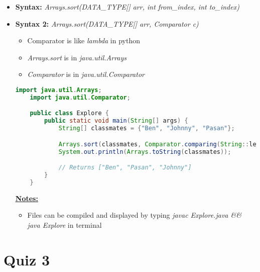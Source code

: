\documentclass[12pt]{article}
\begin{document}
\bigskip


\begin{itemize}
    \item \textbf{Syntax:} \textit{Arrays.sort(DATA\_TYPE[] arr, int from\_index, int to\_index)}
    \item \textbf{Syntax 2:} \textit{Arrays.sort(DATA\_TYPE[] arr, Comparator c)}
    \begin{itemize}
        \item Comparator is like \textit{lambda} in python
        \item \textit{Arrays.sort} is in \textit{java.util.Arrays}
        \item \textit{Comparator} is in \textit{java.util.Comparator}
    \end{itemize}

    \begin{lstlisting}[language=Java, caption={lesson\_03/Explore.java}]
    import java.util.Arrays;
    import java.util.Comparator;

    public class Explore {
        public static void main(String[] args) {
            String[] classmates = {"Ben", "Johnny", "Pasan"};

            Arrays.sort(classmates, Comparator.comparing(String::length)); // <- sorts based on length of string
            System.out.println(Arrays.toString(classmates));

            // Returns ["Ben", "Pasan", "Johnny"]
        }
    }
    \end{lstlisting}

    \underline{\textbf{Notes:}}

    \bigskip

    \begin{itemize}
        \item Files can be compiled and displayed by typing \textit{javac Explore.java \&\& java Explore}
        in terminal
    \end{itemize}
\end{itemize}

\bigskip

\section{Quiz 3}

\bigskip
\end{document}
